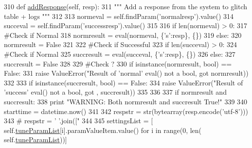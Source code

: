 \begin{DoxyCode}
310     \textcolor{keyword}{def }\hyperlink{classsoftware_1_1chipwhisperer_1_1capture_1_1utils_1_1GlitchExplorerDialog_1_1GlitchExplorerDialog_a6d3ec35ffb4bff5b867778d52fd77248}{addResponse}(self, resp):
311         \textcolor{stringliteral}{""" Add a response from the system to glitch table + logs """}
312 
313         normeval = self.findParam(\textcolor{stringliteral}{'normalresp'}).value()
314         succeval = self.findParam(\textcolor{stringliteral}{'successresp'}).value()
315 
316         \textcolor{keywordflow}{if} len(normeval) > 0:
317             \textcolor{comment}{#Check if Normal}
318             normresult = eval(normeval, \{\textcolor{stringliteral}{'s'}:resp\}, \{\})
319         \textcolor{keywordflow}{else}:
320             normresult = \textcolor{keyword}{False}
321 
322         \textcolor{comment}{#Check if Successful}
323         \textcolor{keywordflow}{if} len(succeval) > 0:
324             \textcolor{comment}{#Check if Normal}
325             succresult = eval(succeval, \{\textcolor{stringliteral}{'s'}:resp\}, \{\})
326         \textcolor{keywordflow}{else}:
327             succresult = \textcolor{keyword}{False}
328 
329         \textcolor{comment}{#Check ?}
330         \textcolor{keywordflow}{if} isinstance(normresult, bool) == \textcolor{keyword}{False}:
331             \textcolor{keywordflow}{raise} ValueError(\textcolor{stringliteral}{"Result of 'normal' eval() not a bool, got %
       normresult))
332 
333         \textcolor{keywordflow}{if} isinstance(succresult, bool) == \textcolor{keyword}{False}:
334             \textcolor{keywordflow}{raise} ValueError(\textcolor{stringliteral}{"Result of 'success' eval() not a bool, got %
      , succresult))
335 
336 
337         \textcolor{keywordflow}{if} normresult \textcolor{keywordflow}{and} succresult:
338             \textcolor{keywordflow}{print} \textcolor{stringliteral}{"WARNING: Both normresult and succresult True!"}
339 
340         starttime = datetime.now()
341 
342         respstr = str(bytearray(resp.encode(\textcolor{stringliteral}{'utf-8'})))
343         \textcolor{comment}{# respstr = ' '.join(["%
344 
345         settingsList = [ self.\hyperlink{classsoftware_1_1chipwhisperer_1_1capture_1_1utils_1_1GlitchExplorerDialog_1_1GlitchExplorerDialog_adc4bbdddb1abd11ae9e8856f079592c3}{tuneParamList}[i].paramValueItem.value() \textcolor{keywordflow}{for} i \textcolor{keywordflow}{in} range(0, len(
      self.\hyperlink{classsoftware_1_1chipwhisperer_1_1capture_1_1utils_1_1GlitchExplorerDialog_1_1GlitchExplorerDialog_adc4bbdddb1abd11ae9e8856f079592c3}{tuneParamList}))]
}}}
\end{DoxyCode}
